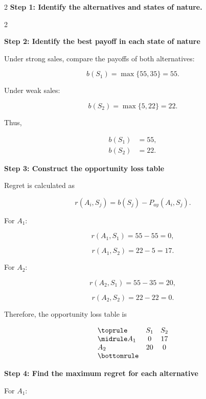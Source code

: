 \begin{multicols}{2}
		\textbf{Step 1: Identify the alternatives and states of nature.}
		
		\noindent
		\setlength{\columnseprule}{0.4pt}
		
		\begin{multicols}{2}
			\vspace{0pt}
			
			\textbf{Step 2: Identify the best payoff in each state of nature}
			
			Under strong sales, compare the payoffs of both alternatives:
			
			\[
			b(S_1)
			=
			\max\{55,35\}
			=
			55.
			\]
			
			Under weak sales:
			
			\[
			b(S_2)
			=
			\max\{5,22\}
			=
			22.
			\]
			
			Thus,
			
			\[
			\begin{aligned}
				b(S_1)&=55,\\
				b(S_2)&=22.
			\end{aligned}
			\]
			
			\textbf{Step 3: Construct the opportunity loss table}
			
			Regret is calculated as
			
			\[
			r(A_i,S_j)
			=
			b(S_j)-P_{ay}(A_i,S_j).
			\]
			
			For $A_1$:
			
			\[
			r(A_1,S_1)
			=
			55-55
			=
			0,
			\]
			
			\[
			r(A_1,S_2)
			=
			22-5
			=
			17.
			\]
			
			For $A_2$:
			
			\[
			r(A_2,S_1)
			=
			55-35
			=
			20,
			\]
			
			\[
			r(A_2,S_2)
			=
			22-22
			=
			0.
			\]
			
			Therefore, the opportunity loss table is
			
			\[
			\begin{array}{lcc}
				\toprule
				& S_1 & S_2\\
				\midrule
				A_1 & 0 & 17\\
				A_2 & 20 & 0\\
				\bottomrule
			\end{array}
			\]
			
			\columnbreak
			
			\textbf{Step 4: Find the maximum regret for each alternative}
			
			For $A_1$:
			

\end{multicols}
\end{multicols}
